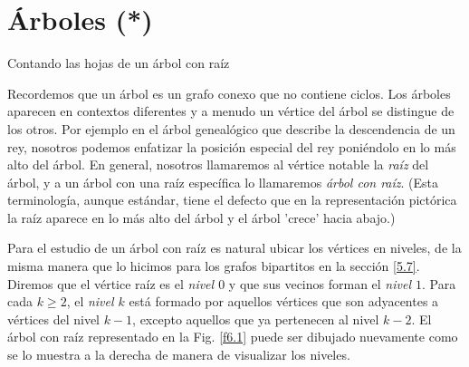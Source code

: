 

\chapter[Árboles]{Árboles (*)}





\begin{section}{Contando las hojas de un árbol con raíz}
\label{6.1}


Recordemos que un {árbol} es un grafo conexo que no contiene
ciclos. Los árboles aparecen en contextos diferentes y a menudo un
vértice del árbol se distingue de los otros. Por ejemplo en el
árbol genealógico que describe la descendencia de un rey, nosotros
podemos enfatizar la posición especial del rey poniéndolo en lo
más alto del árbol. En general, nosotros llamaremos al vértice
notable la {\em raíz} del árbol, y a un árbol con una raíz
 específica lo llamaremos {\em árbol con raíz}. (Esta
 terminología, aunque estándar, tiene el
defecto que en la representación pictórica la raíz aparece en lo
más alto del árbol y el árbol 'crece' hacia abajo.)

Para el estudio de un árbol con raíz es natural ubicar los
vértices en niveles, de la misma manera que lo hicimos para los
grafos bipartitos en la sección \ref{5.7}. Diremos que el vértice
raíz es el {\it nivel $0$} y que sus vecinos forman el {\it nivel $1$}. 
Para cada $k\ge 2$, el {\it nivel $k$} está formado por
aquellos vértices que son adyacentes a vértices del nivel $k-1$,
excepto aquellos que ya pertenecen al nivel $k-2$. El árbol con
raíz representado en la Fig. \ref{f6.1} puede ser dibujado
nuevamente como se lo muestra a la derecha de manera de visualizar
los niveles.



\end{section}

